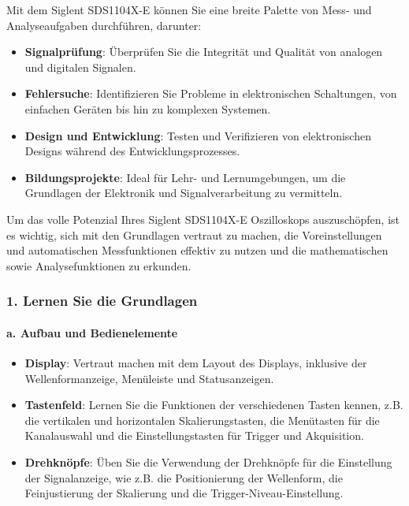 \documentclass{vorlage-design-main}
\begin{document}
Mit dem Siglent SDS1104X-E können Sie eine breite Palette von Mess- und
Analyseaufgaben durchführen, darunter:

\begin{itemize}

\item
  \textbf{Signalprüfung}: Überprüfen Sie die Integrität und Qualität von
  analogen und digitalen Signalen.
\item
  \textbf{Fehlersuche}: Identifizieren Sie Probleme in elektronischen
  Schaltungen, von einfachen Geräten bis hin zu komplexen Systemen.
\item
  \textbf{Design und Entwicklung}: Testen und Verifizieren von
  elektronischen Designs während des Entwicklungsprozesses.
\item
  \textbf{Bildungsprojekte}: Ideal für Lehr- und Lernumgebungen, um die
  Grundlagen der Elektronik und Signalverarbeitung zu vermitteln.
\end{itemize}

Um das volle Potenzial Ihres Siglent SDS1104X-E Oszilloskops
auszuschöpfen, ist es wichtig, sich mit den Grundlagen vertraut zu
machen, die Voreinstellungen und automatischen Messfunktionen effektiv
zu nutzen und die mathematischen sowie Analysefunktionen zu erkunden.

\hypertarget{lernen-sie-die-grundlagen}{%
\subsubsection{1. Lernen Sie die
Grundlagen}\label{lernen-sie-die-grundlagen}}

\hypertarget{a.-aufbau-und-bedienelemente}{%
\paragraph{a. Aufbau und
Bedienelemente}\label{a.-aufbau-und-bedienelemente}}

\begin{itemize}

\item
  \textbf{Display}: Vertraut machen mit dem Layout des Displays,
  inklusive der Wellenformanzeige, Menüleiste und Statusanzeigen.
\item
  \textbf{Tastenfeld}: Lernen Sie die Funktionen der verschiedenen
  Tasten kennen, z.B. die vertikalen und horizontalen Skalierungstasten,
  die Menütasten für die Kanalauswahl und die Einstellungstasten für
  Trigger und Akquisition.
\item
  \textbf{Drehknöpfe}: Üben Sie die Verwendung der Drehknöpfe für die
  Einstellung der Signalanzeige, wie z.B. die Positionierung der
  Wellenform, die Feinjustierung der Skalierung und die
  Trigger-Niveau-Einstellung.
\end{itemize}
\end{document}
